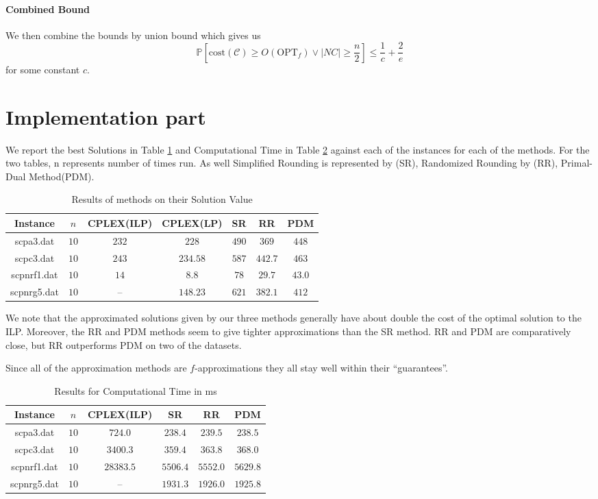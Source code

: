 \documentclass[11pt,a4paper,english]{article}
\newcommand{\PP}{\mathbb{P}}      %
\begin{document}
\paragraph{Combined Bound}
We then combine the bounds by union bound which gives us
$$\PP\left[\mathrm{cost}(\mathcal{C}) \geq O(\mathrm{OPT}_f) \vee  |NC| \geq \frac{n}{2} \right]
\leq \frac{1}{c} + \frac{2}{e}$$
for some constant $c$.

\clearpage


\section{Implementation part}

We report the best Solutions in Table \ref{tab:res} and Computational Time in Table \ref{tab:time} against each of the instances for each of the methods. For the two tables, n represents number of times run. As well Simplified Rounding is represented by (SR), Randomized Rounding by (RR), Primal-Dual Method(PDM).

\begin{table}[h!]
  \centering
  \begin{tabular}{|c|c|c|c|c|c|c|}\hline
    Instance& $n$& CPLEX(ILP)&CPLEX(LP)&SR&RR&PDM  \\\hline
    scpa3.dat &$10$&$232$ & $228$ & $490$& $369$ & $448$  \\
    scpc3.dat &$10$&$243$ & $234.58$ & $587$& $442.7$ & $463$ \\
    scpnrf1.dat &$10$&$14$ & $8.8$ & $78$& $29.7$ & $43.0$  \\
    scpnrg5.dat &$10$&-- & $148.23$ & $621$& $382.1$ & $412$  \\\hline
  \end{tabular}
  \caption{Results of methods on their Solution Value}
  \label{tab:res}
\end{table}

We note that the approximated solutions given by our three methods generally have about double the cost of the optimal solution to the ILP.
Moreover, the RR and PDM methods seem to give tighter approximations than the SR method. RR and PDM are comparatively close, but RR outperforms PDM
on two of the datasets.

Since all of the approximation methods are $f$-approximations \citep[pp. 118-131]{Vaz} they all stay well within their ``guarantees''.

\begin{table}[h!]
  \centering
  \begin{tabular}{|c|c|c|c|c|c|}\hline
    Instance& $n$& CPLEX(ILP)&SR&RR&PDM \\\hline
    scpa3.dat &$10$&$724.0$ & $238.4$& $239.5$ & $238.5$  \\
    scpc3.dat &$10$ & $3400.3$ & $359.4$& $363.8$ & $368.0$ \\
    scpnrf1.dat	 &$10$ & $28383.5$ & $5506.4$& $5552.0$ & $5629.8$  \\
    scpnrg5.dat &$10$ & -- & $1931.3$& $1926.0$ & $1925.8$  \\\hline
  \end{tabular}
  \caption{Results for Computational Time in ms}
  \label{tab:time}
\end{table}
\end{document}
